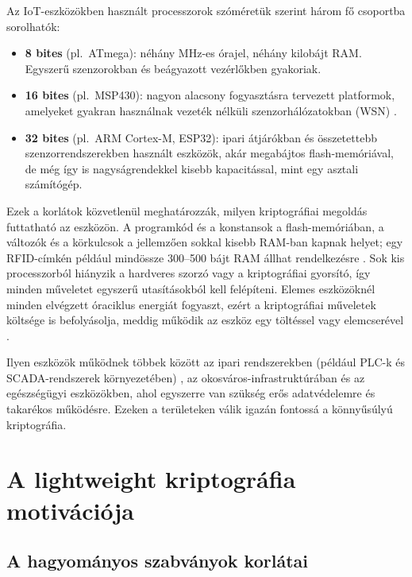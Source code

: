 \documentclass[a4paper,12pt]{report}
\theoremstyle{definition}
\theoremstyle{remark}
\begin{document}
Az IoT-eszközökben használt processzorok szóméretük szerint három fő csoportba sorolhatók:
\begin{itemize}
	\item \textbf{8 bites} (pl.~ATmega): néhány MHz-es órajel, néhány kilobájt RAM. Egyszerű szenzorokban és beágyazott vezérlőkben gyakoriak.
	\item \textbf{16 bites} (pl.~MSP430): nagyon alacsony fogyasztásra tervezett platformok, amelyeket gyakran használnak vezeték nélküli szenzorhálózatokban (WSN) \cite{NISTIR8114}.
	\item \textbf{32 bites} (pl.~ARM Cortex-M, ESP32): ipari átjárókban és összetettebb szenzorrendszerekben használt eszközök, akár megabájtos flash-memóriával, de még így is nagyságrendekkel kisebb kapacitással, mint egy asztali számítógép.
\end{itemize}

Ezek a korlátok közvetlenül meghatározzák, milyen kriptográfiai megoldás futtatható az eszközön. A programkód és a konstansok a flash-memóriában, a változók és a körkulcsok a jellemzően sokkal kisebb RAM-ban kapnak helyet; egy RFID-címkén például mindössze 300--500 bájt RAM állhat rendelkezésre \cite{Hatzivasilis2018}. Sok kis processzorból hiányzik a hardveres szorzó vagy a kriptográfiai gyorsító, így minden műveletet egyszerű utasításokból kell felépíteni. Elemes eszközöknél minden elvégzett óraciklus energiát fogyaszt, ezért a kriptográfiai műveletek költsége is befolyásolja, meddig működik az eszköz egy töltéssel vagy elemcserével \cite{NISTIR8114}.

Ilyen eszközök működnek többek között az ipari rendszerekben (például PLC-k és SCADA-rendszerek környezetében) \cite{Sadeghi2015}, az okosváros-infrastruktúrában és az egészségügyi eszközökben, ahol egyszerre van szükség erős adatvédelemre és takarékos működésre. Ezeken a területeken válik igazán fontossá a könnyűsúlyú kriptográfia.

\section{A lightweight kriptográfia motivációja}\label{sec:lwc_motivacio}

\subsection{A hagyományos szabványok korlátai}
\end{document}
